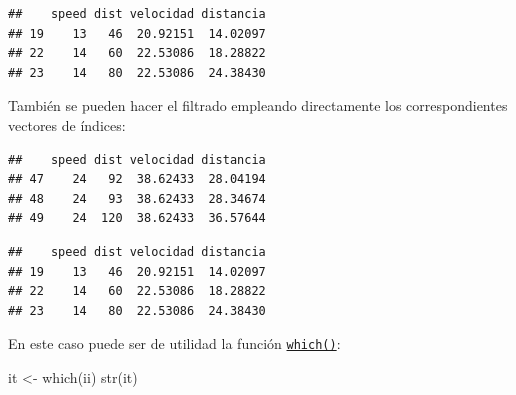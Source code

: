 \documentclass[
]{book}
\newenvironment{Shaded}{\begin{snugshade}}{\end{snugshade}}
\newcommand{\CommentTok}[1]{\textcolor[rgb]{0.56,0.35,0.01}{\textit{#1}}}
\newcommand{\DecValTok}[1]{\textcolor[rgb]{0.00,0.00,0.81}{#1}}
\newcommand{\FunctionTok}[1]{\textcolor[rgb]{0.00,0.00,0.00}{#1}}
\newcommand{\NormalTok}[1]{#1}
\newcommand{\OtherTok}[1]{\textcolor[rgb]{0.56,0.35,0.01}{#1}}
\newcommand{\SpecialCharTok}[1]{\textcolor[rgb]{0.00,0.00,0.00}{#1}}
\theoremstyle{break}
\begin{document}
\begin{verbatim}
##    speed dist velocidad distancia
## 19    13   46  20.92151  14.02097
## 22    14   60  22.53086  18.28822
## 23    14   80  22.53086  24.38430
\end{verbatim}

También se pueden hacer el filtrado empleando directamente los
correspondientes vectores de índices:

\begin{Shaded}
\end{Shaded}

\begin{verbatim}
##    speed dist velocidad distancia
## 47    24   92  38.62433  28.04194
## 48    24   93  38.62433  28.34674
## 49    24  120  38.62433  36.57644
\end{verbatim}

\begin{Shaded}
\end{Shaded}

\begin{verbatim}
##    speed dist velocidad distancia
## 19    13   46  20.92151  14.02097
## 22    14   60  22.53086  18.28822
## 23    14   80  22.53086  24.38430
\end{verbatim}

En este caso puede ser de utilidad la función \href{https://www.rdocumentation.org/packages/base/versions/3.6.1/topics/which}{\texttt{which()}}:

\begin{Shaded}
\begin{Highlighting}[]
\NormalTok{it }\OtherTok{\textless{}{-}} \FunctionTok{which}\NormalTok{(ii)}
\FunctionTok{str}\NormalTok{(it)}
\end{Highlighting}
\end{Shaded}
\end{document}
